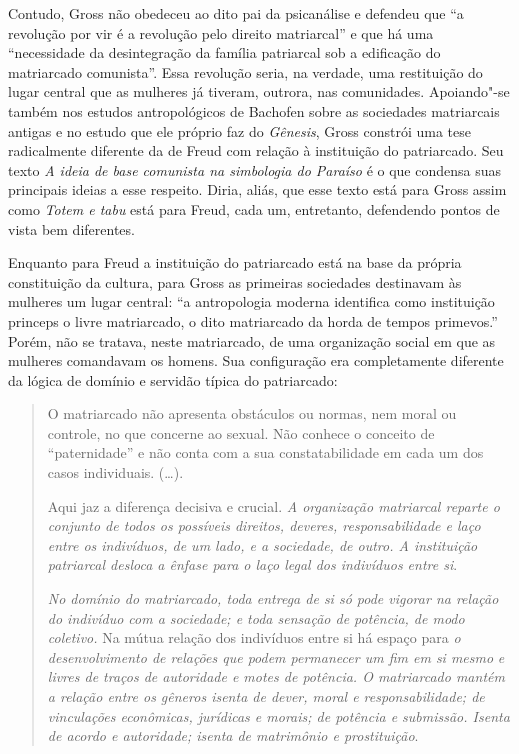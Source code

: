 Contudo, Gross não obedeceu ao dito pai da psicanálise e defendeu que
``a revolução por vir é a revolução pelo direito matriarcal'' e que há
uma ``necessidade da desintegração da família patriarcal sob a
edificação do matriarcado comunista''. Essa revolução seria, na
verdade, uma restituição do lugar central que as mulheres já tiveram,
outrora, nas comunidades. Apoiando"-se também nos estudos antropológicos
de Bachofen sobre as sociedades matriarcais antigas e no estudo que ele
próprio faz do \emph{Gênesis}, Gross constrói uma tese radicalmente
diferente da de Freud com relação à instituição do patriarcado. Seu
texto \emph{A ideia de base comunista na simbologia do Paraíso} é o que
condensa suas principais ideias a esse respeito. Diria, aliás, que esse
texto está para Gross assim como \emph{Totem e tabu} está para Freud,
cada um, entretanto, defendendo pontos de vista bem diferentes.

Enquanto para Freud a instituição do patriarcado está na base da própria
constituição da cultura, para Gross as primeiras sociedades destinavam
às mulheres um lugar central: ``a antropologia moderna identifica como
instituição princeps o livre matriarcado, o dito matriarcado da horda de
tempos primevos.'' Porém, não se tratava, neste matriarcado, de uma
organização social em que as mulheres comandavam os homens. Sua
configuração era completamente diferente da lógica de domínio e servidão
típica do patriarcado:

\begin{quote}
O matriarcado não apresenta obstáculos ou normas, nem moral ou controle,
no que concerne ao sexual. Não conhece o conceito de ``paternidade'' e
não conta com a sua constatabilidade em cada um dos casos individuais.
(\ldots{}).

Aqui jaz a diferença decisiva e crucial. \emph{A organização matriarcal
reparte o conjunto de todos os possíveis direitos, deveres,
responsabilidade e laço entre os indivíduos, de um lado, e a sociedade,
de outro. A instituição patriarcal desloca a ênfase para o laço legal
dos indivíduos entre si}.

\emph{No domínio do matriarcado, toda entrega de si só pode vigorar na
relação do indivíduo com a sociedade; e toda sensação de potência, de
modo coletivo.} Na mútua relação dos indivíduos entre si há espaço para
\emph{o desenvolvimento de relações que podem permanecer um fim em si
mesmo} \emph{e livres de traços de autoridade e motes de potência. O
matriarcado mantém a relação entre os gêneros isenta de dever, moral e
responsabilidade; de vinculações econômicas, jurídicas e morais; de
potência e submissão. Isenta de acordo e autoridade; isenta de
matrimônio e prostituição}.
\end{quote}

